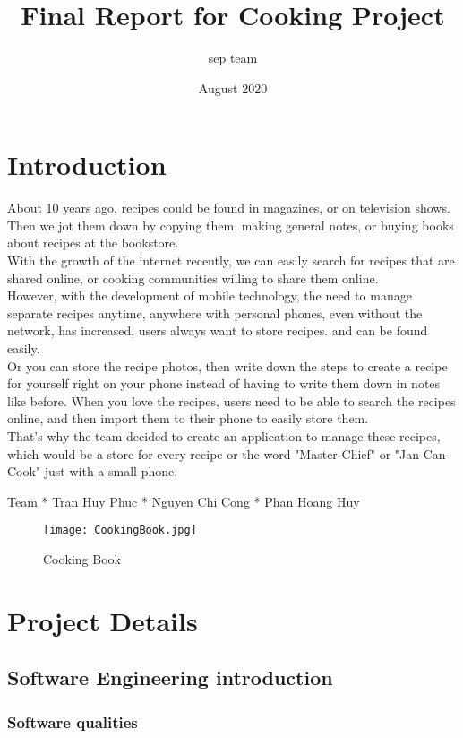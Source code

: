 \documentclass{article}
\title{Final Report for Cooking Project}
\author{sep team }
\date{August 2020}
\begin{document}
\maketitle

\section{Introduction}
About 10 years ago, recipes could be found in magazines, or on television shows.
Then we jot them down by copying them, making general notes, or buying books about recipes at the bookstore.\\
With the growth of the internet recently, we can easily search for recipes that are shared online, or cooking communities willing to share them online.\\
However, with the development of mobile technology, the need to manage separate recipes anytime, anywhere with personal phones, even without the network, has increased, users always want to store recipes. and can be found easily.\\
Or you can store the recipe photos, then write down the steps to create a recipe for yourself right on your phone instead of having to write them down in notes like before.
When you love the recipes, users need to be able to search the recipes online, and then import them to their phone to easily store them. \\
That's why the team decided to create an application to manage these recipes, which would be a store for every recipe or the word "Master-Chief" or "Jan-Can-Cook" just with a small phone.

Team  
* Tran Huy Phuc
* Nguyen Chi Cong 
* Phan Hoang Huy

\begin{figure}[h!]
\centering
\texttt{[image: CookingBook.jpg]}
\caption{Cooking Book}
\label{fig:cookingbook}
\end{figure}

\section{Project Details }

\subsection{Software Engineering introduction}


\subsubsection{Software qualities}
\end{document}
